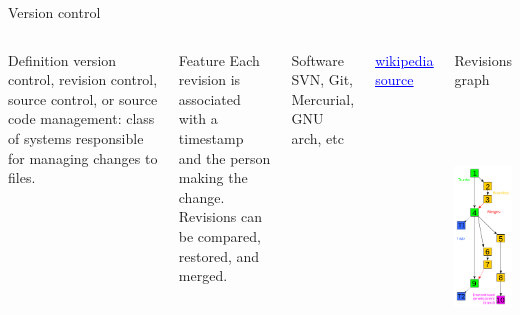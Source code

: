 \begin{frame}{Version control}
\begin{columns}
   \begin{block}{Definition}
version control, revision control, source control, or source code management: class of systems responsible for managing changes to files.
   \end{block}
   \begin{block}{Feature}
Each revision is associated with a timestamp and the person making the change. \\
Revisions can be compared, restored, and merged.
   \end{block}
   \begin{block}{Software}
   SVN, Git, Mercurial, GNU arch, etc
   \end{block}
   \href{https://en.wikipedia.org/wiki/Version_control}{\textcolor{blue}{\underline{wikipedia source}}}
   \begin{block}{Revisions graph}
   \begin{center}
      \href{https://en.wikipedia.org/wiki/File:Revision_controlled_project_visualization-2010-24-02.svg}{\includegraphics[height=7cm]{05_history/Images/FAIR_git_revision_graph_wikipedia.png}}
   \end{center}
   \end{block}
\end{columns}
\end{frame}
